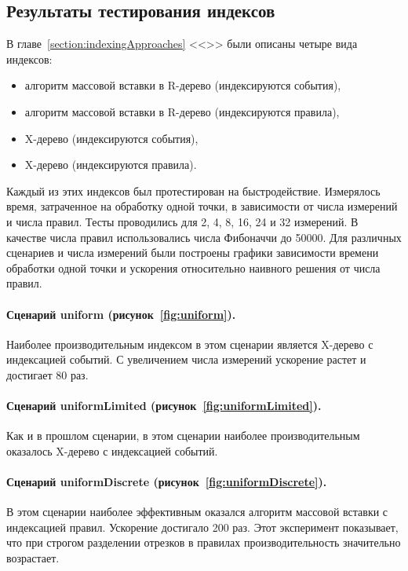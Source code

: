 \documentclass[14pt]{article}
\begin{document}
\subsection{Результаты тестирования индексов}
\label{section:indexTestingResults}
В главе~\ref{section:indexingApproaches} <<>> были описаны четыре вида индексов:
\begin{itemize}
    \item алгоритм массовой вставки в R-дерево (индексируются события),
    \item алгоритм массовой вставки в R-дерево (индексируются правила),
    \item X-дерево (индексируются события),
    \item X-дерево (индексируются правила).
\end{itemize}
Каждый из этих индексов был протестирован на быстродействие. Измерялось время, затраченное на обработку одной точки, в зависимости от числа измерений и числа правил. Тесты проводились для 2, 4, 8, 16, 24 и 32 измерений. В качестве числа правил использовались числа Фибоначчи до 50000. Для различных сценариев и числа измерений были построены графики зависимости времени обработки одной точки и ускорения относительно наивного решения от числа правил.

\paragraph{Сценарий uniform (рисунок~\ref{fig:uniform}).} Наиболее производительным индексом в этом сценарии является X-дерево с индексацией событий. С увеличением числа измерений ускорение растет и достигает 80 раз.

\paragraph{Сценарий uniformLimited (рисунок~\ref{fig:uniformLimited}).} Как и в прошлом сценарии, в этом сценарии наиболее производительным оказалось X-дерево с индексацией событий.

\paragraph{Сценарий uniformDiscrete (рисунок~\ref{fig:uniformDiscrete}).} В этом сценарии наиболее эффективным оказался алгоритм массовой вставки с индексацией правил. Ускорение достигало 200 раз. Этот эксперимент показывает, что при строгом разделении отрезков в правилах производительность значительно возрастает.
\end{document}

